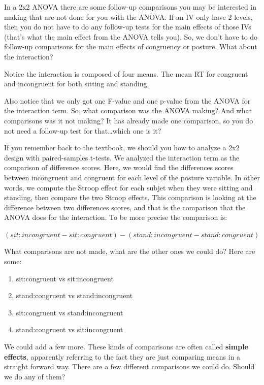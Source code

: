 \documentclass[]{book}
\providecommand{\tightlist}{%
  \setlength{\itemsep}{0pt}\setlength{\parskip}{0pt}}
\begin{document}
In a 2x2 ANOVA there are some follow-up comparisons you may be
interested in making that are not done for you with the ANOVA. If an IV
only have 2 levels, then you do not have to do any follow-up tests for
the main effects of those IVs (that's what the main effect from the
ANOVA tells you). So, we don't have to do follow-up comparisons for the
main effects of congruency or posture. What about the interaction?

Notice the interaction is composed of four means. The mean RT for
congruent and incongruent for both sitting and standing.

Also notice that we only got one F-value and one p-value from the ANOVA
for the interaction term. So, what comparison was the ANOVA making? And
what comparisons was it not making? It has already made one comparison,
so you do not need a follow-up test for that\ldots{}which one is it?

If you remember back to the textbook, we should you how to analyze a 2x2
design with paired-samples t-tests. We analyzed the interaction term as
the comparison of difference scores. Here, we would find the differences
scores between incongruent and congruent for each level of the posture
variable. In other words, we compute the Stroop effect for each subjet
when they were sitting and standing, then compare the two Stroop
effects. This comparison is looking at the difference between two
differences scores, and that is the comparison that the ANOVA does for
the interaction. To be more precise the comparison is:

\((sit:incongruent - sit:congruent) - (stand:incongruent - stand:congruent)\)

What comparisons are not made, what are the other ones we could do? Here
are some:

\begin{enumerate}
\def\labelenumi{\arabic{enumi}.}
\tightlist
\item
  sit:congruent vs sit:incongruent
\item
  stand:congruent vs stand:incongruent
\item
  sit:congruent vs stand:incongruent
\item
  stand:congruent vs sit:incongruent
\end{enumerate}

We could add a few more. These kinds of comparisons are often called
\textbf{simple effects}, apparently referring to the fact they are just
comparing means in a straight forward way. There are a few different
comparisons we could do. Should we do any of them?
\end{document}
